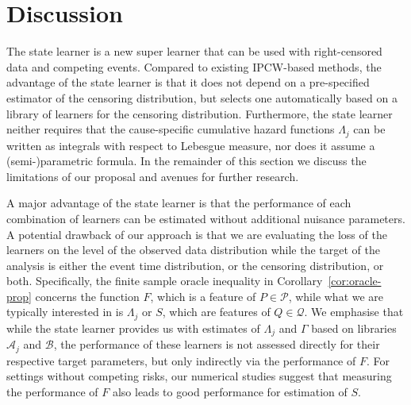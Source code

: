 \documentclass[numsec,webpdf,contemporary,medium,namedate]{oup-authoring-template}%
\theoremstyle{thmstyleone}%
\theoremstyle{thmstyletwo}%
\theoremstyle{thmstylethree}%
\newcommand{\1}{\mathds{1}}
\begin{document}
\section{Discussion}
\label{sec:discussion}

The state learner is a new super learner that can be used with
right-censored data and competing events. Compared to existing
IPCW-based methods, the advantage of the state learner is that it does
not depend on a pre-specified estimator of the censoring distribution,
but selects one automatically based on a library of learners for the
censoring distribution. Furthermore, the state learner neither
requires that the cause-specific cumulative hazard functions
\( \Lambda_j \) can be written as integrals with respect to Lebesgue
measure, nor does it assume a (semi-)parametric formula. In the
remainder of this section we discuss the limitations of our proposal
and avenues for further research.

A major advantage of the state learner is that the performance of each
combination of learners can be estimated without additional nuisance
parameters. A potential drawback of our approach is that we are
evaluating the loss of the learners on the level of the observed data
distribution while the target of the analysis is either the event time
distribution, or the censoring distribution, or both.
Specifically, the finite sample oracle inequality in
Corollary~\ref{cor:oracle-prop} concerns the function \( F \), which
is a feature of \( P \in \mathcal{P} \), while what we are typically
interested in is \( \Lambda_j \) or \( S \), which are features of
\( Q \in \mathcal{Q} \). We emphasise that while the state learner
provides us with estimates of \( \Lambda_j \) and $\Gamma$ based on
libraries \( \mathcal{A}_j \) and \( \mathcal{B} \), the performance
of these learners is not assessed directly for their respective target
parameters, but only indirectly via the performance of \( F \).  For
settings without competing risks, our numerical studies suggest that
measuring the performance of \( F \) also leads to good performance
for estimation of \( S \).

\end{document}
